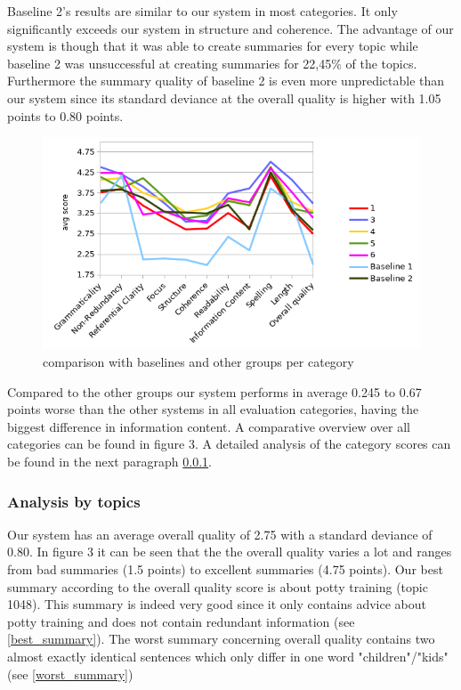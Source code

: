 Baseline 2's results are similar to our system in most categories. It only significantly exceeds our system in structure and coherence. The advantage of our system is though that it was able to create summaries for every topic while baseline 2 was unsuccessful at creating summaries for 22,45\% of the topics. Furthermore the summary quality of baseline 2 is even more unpredictable than our system since its standard deviance at the overall quality is higher with 1.05 points to 0.80 points.

\begin{figure}[ht]
	\centering
	\label{fig:quality_per_category}
	\caption{comparison with baselines and other groups per category}
	\includegraphics[width=0.8\linewidth]{figures/quality_per_category.png}
\end{figure}  


Compared to the other groups our system performs in average 0.245 to 0.67 points worse than the other systems in all evaluation  categories, having the biggest difference in information content. A comparative overview over all categories can be found in figure 3. A detailed analysis of the category scores can be found in the next paragraph \ref{analysis_by_topics}.

\subsubsection{Analysis by topics}
\label{analysis_by_topics}

Our system has an average overall quality of 2.75 with a standard deviance of 0.80. In figure 3 it can be seen that the the overall quality varies a lot and ranges from bad summaries (1.5 points) to excellent summaries (4.75 points). Our best summary according to the overall quality score is about potty training (topic 1048). This summary is indeed very good since it only contains advice about potty training and does not contain redundant information (see \ref{best_summary}). The worst summary concerning overall quality contains two almost exactly identical sentences which only differ in one word "children"/"kids" (see \ref{worst_summary})

